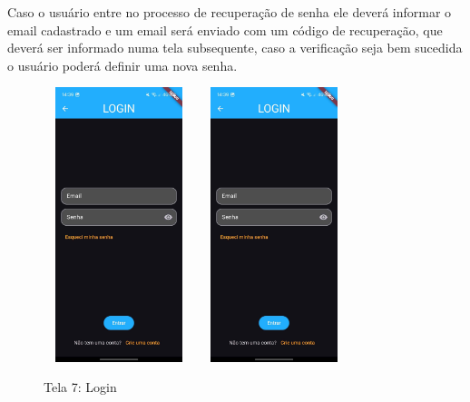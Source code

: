     Caso o usuário entre no processo de recuperação de senha ele deverá informar o email cadastrado e um email será enviado com um código de recuperação, que deverá ser informado numa tela subsequente, caso a verificação seja bem sucedida o usuário poderá definir uma nova senha.
    
    \FloatBarrier

    \begin{figure}[h]
        \centering
        \includegraphics[width=44mm,height=80mm]{imagens/login.jpg} %
        \hspace{10mm}
        \includegraphics[width=44mm,height=80mm]{imagens/login.jpg} %
        \caption{\scriptsize Tela 7: Login}
        \footnotesize  {}
        \label{fig:tela7-recuperacao}
    \end{figure}

    \FloatBarrier